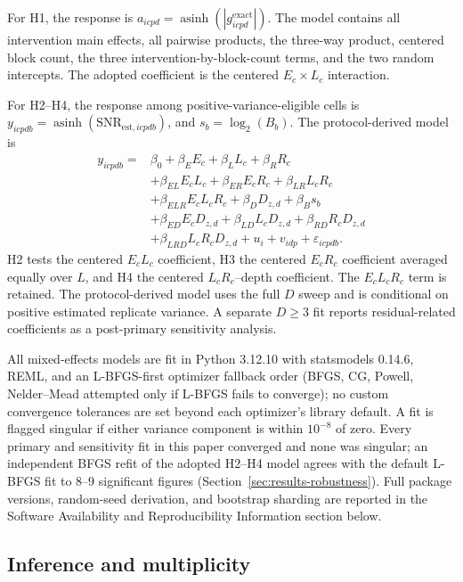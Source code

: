 \documentclass[pdflatex,sn-basic,Numbered]{sn-jnl}
\begin{document}
For H1, the response is $a_{icpd}=\operatorname{asinh}(|g^{\mathrm{exact}}_{icpd}|)$. The model contains all intervention main effects, all pairwise products, the three-way product, centered block count, the three intervention-by-block-count terms, and the two random intercepts. The adopted coefficient is the centered $E_c\times L_c$ interaction.

For H2--H4, the response among positive-variance-eligible cells is $y_{icpdb}=\operatorname{asinh}(\mathrm{SNR}_{\mathrm{est},icpdb})$, and $s_b=\log_2(B_b)$. The protocol-derived model is
\begin{align*}
y_{icpdb}={}&\beta_0
+\beta_E E_c+\beta_L L_c+\beta_R R_c\\
&+\beta_{EL}E_cL_c+\beta_{ER}E_cR_c+\beta_{LR}L_cR_c\\
&+\beta_{ELR}E_cL_cR_c+\beta_DD_{z,d}+\beta_B s_b\\
&+\beta_{ED}E_cD_{z,d}+\beta_{LD}L_cD_{z,d}+\beta_{RD}R_cD_{z,d}\\
&+\beta_{LRD}L_cR_cD_{z,d}
+u_i+v_{idp}+\varepsilon_{icpdb}.
\end{align*}
H2 tests the centered $E_cL_c$ coefficient, H3 the centered $E_cR_c$ coefficient averaged equally over $L$, and H4 the centered $L_cR_c$--depth coefficient. The $E_cL_cR_c$ term is retained. The protocol-derived model uses the full $D$ sweep and is conditional on positive estimated replicate variance. A separate $D\ge3$ fit reports residual-related coefficients as a post-primary sensitivity analysis.

All mixed-effects models are fit in Python 3.12.10 with statsmodels 0.14.6, REML, and an L-BFGS-first optimizer fallback order (BFGS, CG, Powell, Nelder--Mead attempted only if L-BFGS fails to converge); no custom convergence tolerances are set beyond each optimizer's library default. A fit is flagged singular if either variance component is within $10^{-8}$ of zero. Every primary and sensitivity fit in this paper converged and none was singular; an independent BFGS refit of the adopted H2--H4 model agrees with the default L-BFGS fit to 8--9 significant figures (Section~\ref{sec:results-robustness}). Full package versions, random-seed derivation, and bootstrap sharding are reported in the Software Availability and Reproducibility Information section below.

\subsection{Inference and multiplicity}
\end{document}
